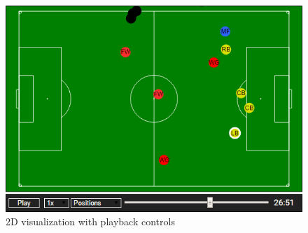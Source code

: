\documentclass{article}
\begin{document}
\begin{figure}[ht!]
    \centering
    \includegraphics[scale=0.55]{2dvis.png}
    \caption{2D visualization with playback controls}
    \label{fig:2dvis}
\end{figure}
\end{document}
